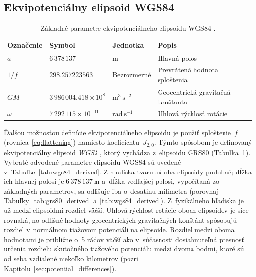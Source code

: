 \documentclass[a4paper,12pt]{book}
\begin{document}
\subsection{Ekvipotenciálny elipsoid WGS84}
\label{sec:wgs84}

\begin{table}
\begin{center}
\caption{Základné parametre ekvipotenciálneho elipsoidu WGS84 
\parencite{WGS84}.}
\label{tab:wgs84_fundamental}
\small
\begin{tabular}{l l l l}
\hline
Označenie & Symbol & Jednotka & Popis\\
\hline
$a$       & $6\,378\,137$ & m & Hlavná polos\\
$1 \slash f$ & $298.257223563$ & Bezrozmerné & Prevrátená hodnota sploštenia\\
$GM$ & $3\,986\,004.418 \times 10^8$ & $\mathrm{m}^3 \ \mathrm{s}^{-2}$ 
& Geocentrická gravitačná konštanta\\
$\omega$ & $7\,292\,115 \times 10^{-11}$ & $\mathrm{rad} \ \mathrm{s}^{-1}$ 
& Uhlová rýchlosť rotácie\\
\hline
\end{tabular}
\end{center}
\end{table}

Ďalšou možnosťou definície ekvipotenciálneho elipsoidu je použiť sploštenie~$f$ 
(rovnica~\ref{eq:flattening}) namiesto koeficientu~$J_{2,0}$.  Týmto spôsobom 
je definovaný ekvipotenciálny elipsoid \emph{WGS4} 
\parencite[angl. \textit{World Geodetic System~1984};][]{WGS84}, ktorý vychádza 
z~elipsoidu GRS80 (Tabuľka~\ref{tab:wgs84_fundamental}).  Vybraté odvodené 
parametre elipsoidu WGS84 sú uvedené v~Tabuľke~\ref{tab:wgs84_derived}.  
Z hľadiska tvaru sú oba elipsoidy podobné; dĺžka ich hlavnej polosi je $6\, 
378\, 137\ \mathrm{m}$ a~dĺžka vedľajšej polosi, vypočítaná zo základných 
parametrov, sa odlišuje iba o~desatinu milimetra (porovnaj 
Tabuľky~\ref{tab:grs80_derived} a~\ref{tab:wgs84_derived}).  Z~fyzikálneho 
hľadiska je už medzi elipsoidmi rozdiel väčší.  Uhlová rýchlosť rotácie oboch 
elipsoidov je síce rovnaká, no odlišné hodnoty geocentrických gravitačných 
konštánt spôsobujú rozdiel v~normálnom tiažovom potenciáli na elipsoide.  
Rozdiel medzi oboma hodnotami je približne o~5 rádov väčší ako v~súčasnosti 
dosiahnuteľná presnosť určenia rozdielu skutočného tiažového potenciálu medzi 
dvoma bodmi, ktoré sú od seba vzdialené niekoľko kilometrov (pozri 
Kapitolu~\ref{sec:potential_differences}).
\end{document}
